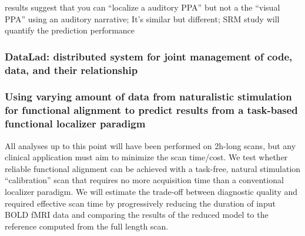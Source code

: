 results suggest that you can ``localize a auditory PPA'' but not a the ``visual
PPA'' using an auditory narrative; It's similar but different; SRM study will
quantify the prediction performance

\subsubsection{DataLad: distributed system for joint management of code, data,
and their relationship}



\subsubsection{Using varying amount of data from naturalistic stimulation for
functional alignment to predict results from a task-based functional localizer
paradigm}
%
All analyses up to this point will have been performed on 2h-long scans, but any
clinical application must aim to minimize the scan time/cost.
%
We test whether reliable functional alignment can be achieved with a task-free,
natural stimulation ``calibration” scan that requires no more acquisition time
than a conventional localizer paradigm.
%
We will estimate the trade-off between diagnostic quality and required effective
scan time by progressively reducing the duration of input BOLD fMRI data and
comparing the results of the reduced model to the reference computed from the
full length scan.


